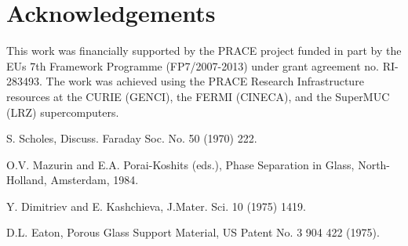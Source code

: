 \documentclass{prace}
\begin{document}
\section*{Acknowledgements}
This work was financially supported by the PRACE project funded in part
by the EUs 7th Framework Programme (FP7/2007-2013) under grant agreement
no. RI-283493. The work was achieved using the PRACE Research Infrastructure
resources at the CURIE (GENCI), the FERMI (CINECA), and the SuperMUC (LRZ)
supercomputers.

\begin{thebibliography}{99}

S. Scholes, Discuss. Faraday Soc. No. 50 (1970) 222.

O.V. Mazurin and E.A. Porai-Koshits (eds.), 
Phase Separation in Glass, North-Holland, Amsterdam, 1984.

Y. Dimitriev and E. Kashchieva, J.Mater. Sci. 10 (1975) 1419.

D.L. Eaton, Porous Glass Support Material, US Patent No. 3 904 422 (1975).

\end{thebibliography}

\end{document}
